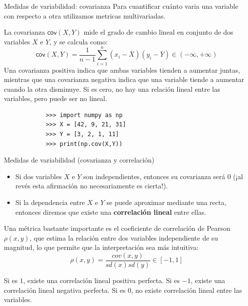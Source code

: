 \documentclass[aspectratio=169,handout]{beamer}
\begin{document}
    \begin{frame}[fragile]{Medidas de variabilidad: covarianza}
        Para cuantificar cuánto varia una variable con respecto a otra utilizamos metricas multivariadas. 

        \pause
        La covarianza $\textsf{cov}(X,Y)$ mide el grado de cambio lineal en conjunto de dos variables $X$ e $Y$, y se calcula como:
        \[ 
            \textsf{cov}(X,Y) = \frac{1}{n-1} \sum^n_{i=1} (x_i - \bar{X}) (y_i - \bar{Y}) \in (-\infty, +\infty)
        \]
        \pause
        Una covarianza positiva indica que ambas variables tienden a aumentar juntas, mientras que una covarianza negativa indica que una variable tiende a aumentar cuando la otra disminuye. Si es cero, no hay una relación lineal entre las variables, pero puede ser no lineal.
        
        \pause
        \begin{verbatim}
            >>> import numpy as np
            >>> X = [42, 9, 21, 31]
            >>> Y = [3, 2, 1, 11]
            >>> print(np.cov(X,Y))
        \end{verbatim}
    \end{frame}

    \begin{frame}[fragile]{Medidas de variabilidad (covarianza y correlación)}
        \begin{itemize}
            \item Si dos variables $X$ e $Y$ son independientes, entonces su covarianza será $0$ (¡al revés esta afirmación no necesariamente es cierta!).
            \pause
            \item Si la dependencia entre $X$ e $Y$ se puede aproximar mediante una recta, entonces diremos que existe una \textbf{correlación lineal} entre ellas.
        \end{itemize}

        \pause
        Una métrica bastante importante es el coeficiente de correlación de Pearson $\rho(x,y)$, que estima la relación entre dos variables independiente de su magnitud, lo que permite que la interpretación sea más intuitiva:
        \[
            \rho(x,y) = \frac{cov(x,y)}{sd(x)sd(y)} \in [-1, 1]
        \]

        \pause
        Si es $1$, existe una correlación lineal positiva perfecta. Si es $-1$, existe una correlación lineal negativa perfecta. Si es $0$, no existe correlación lineal entre las variables.
    \end{frame}
\end{document}
